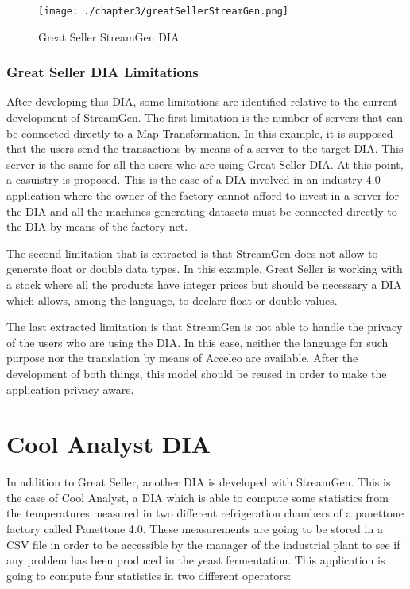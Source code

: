 \begin{figure}
\centering
{\texttt{[image: ./chapter3/greatSellerStreamGen.png]}}
\caption{Great Seller StreamGen DIA}
\label{fig:Great Seller StreamGen DIA}
\end{figure}

\subsubsection*{Great Seller DIA Limitations}

After developing this DIA, some limitations are identified relative to the current development of StreamGen. The first limitation is the number of servers that can be connected directly to a Map Transformation. In this example, it is supposed that the users send the transactions by means of a server to the target DIA. This server is the same for all the users who are using Great Seller DIA. At this point, a casuistry is proposed. This is the case of a DIA involved in an industry 4.0 application where the owner of the factory cannot afford to invest in a server for the DIA and all the machines generating datasets must be connected directly to the DIA by means of the factory net.

The second limitation that is extracted is that StreamGen does not allow to generate float or double data types. In this example, Great Seller is working with a stock where all the products have integer prices but should be necessary a DIA which allows, among the language, to declare float or double values.

The last extracted limitation is that StreamGen is not able to handle the privacy of the users who are using the DIA. In this case, neither the language for such purpose nor the translation by means of Acceleo are available. After the development of both things, this model should be reused in order to make the application privacy aware.

\section{Cool Analyst DIA}

In addition to Great Seller, another DIA is developed with StreamGen. This is the case of Cool Analyst, a DIA which is able to compute some statistics from the temperatures measured in two different refrigeration chambers of a panettone factory called Panettone 4.0. These measurements are going to be stored in a CSV file in order to be accessible by the manager of the industrial plant to see if any problem has been produced in the yeast fermentation. This application is going to compute four statistics in two different operators:

